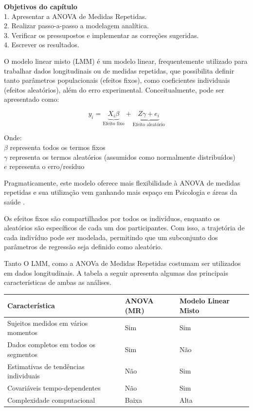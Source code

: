 \documentclass[
]{book}
\newenvironment{objectives}{
  \definecolor{shadecolor}{rgb}{0.764,0.992,0.686}  %
  \color{black}
  \begin{shaded}}
 {\end{shaded}}
\begin{document}
\begin{objectives}
\textbf{Objetivos do capítulo}\\
1. Apresentar a ANOVA de Medidas Repetidas.\\
2. Realizar passo-a-passo a modelagem analítica.\\
3. Verificar os pressupostos e implementar as correções sugeridas.\\
4. Escrever os resultados.

\end{objectives}

O modelo linear misto (LMM) é um modelo linear, frequentemente utilizado para trabalhar dados longitudinais ou de medidas repetidas, que possibilita definir tanto parâmetros populacionais (efeitos fixos), como coeficientes individuais (efeitos aleatórios), além do erro experimental. Conceitualmente, pode ser apresentado como:

\[y_i = \underbrace{X_i\beta}_\text{Efeito fixo} + \underbrace{Z\gamma + e_i}_\text{Efeito aleatório}\]

Onde:\\
\(\beta\) representa todos os termos fixos\\
\(\gamma\) representa os termos aleatórios (assumidos como normalmente distribuídos)\\
\(e\) representa o erro/resíduo

Pragmaticamente, este modelo oferece mais flexibilidade à ANOVA de medidas repetidas e sua utilização vem ganhando mais espaço em Psicologia e áreas da saúde \citep{Gueorguieva2004}.

Os efeitos fixos são compartilhados por todos os indivíduos, enquanto os aleatórios são específicos de cada um dos participantes. Com isso, a trajetória de cada indivíduo pode ser modelada, permitindo que um subconjunto dos parâmetros de regressão seja definido como aleatório.

Tanto O LMM, como a ANOVa de Medidas Repetidas costumam ser utilizados em dados longitudinais. A tabela a seguir apresenta algumas das principais características de ambas as análises.

\begin{longtable}[]{@{}lll@{}}
\toprule
Característica & ANOVA (MR) & Modelo Linear Misto\tabularnewline
\midrule
\endhead
Sujeitos medidos em vários momentos & Sim & Sim\tabularnewline
Dados completos em todos os segmentos & Sim & Não\tabularnewline
Estimativas de tendências individuais & Não & Sim\tabularnewline
Covariáveis tempo-dependentes & Não & Sim\tabularnewline
Complexidade computacional & Baixa & Alta\tabularnewline
\bottomrule
\end{longtable}
\end{document}
